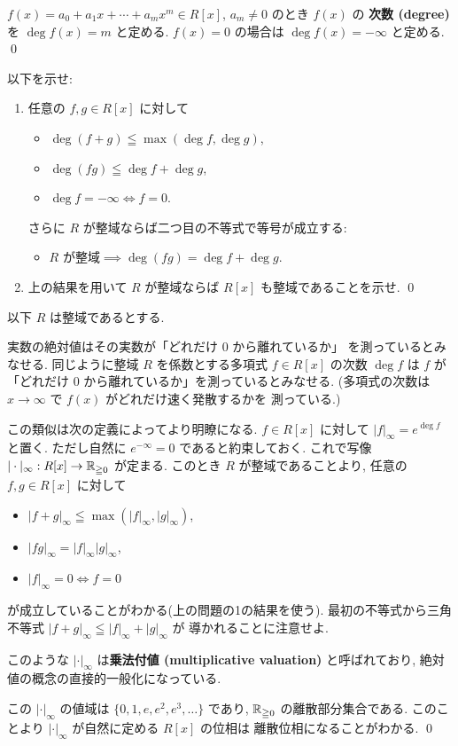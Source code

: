 \documentclass[12pt,twoside]{jarticle}
\begin{document}
\begin{definition}[多項式の次数]
 $f(x)=a_0+a_1x+\cdots+a_mx^m\in R[x]$, $a_m\ne 0$ のとき $f(x)$ の
 {\bf 次数 (degree)} を $\deg f(x)=m$ と定める.
 $f(x)=0$ の場合は $\deg f(x)=-\infty$ と定める.
 \qed
\end{definition}

\begin{question}[整域係数の多項式環も整域1]
 以下を示せ:
 \begin{enumerate}
  \item 任意の $f,g\in R[x]$ に対して
  \begin{itemize}
   \item $\deg(f+g) \leqq \max(\deg f, \deg g)$,
   \item $\deg(fg)  \leqq \deg f + \deg g$,
   \item $\deg f = -\infty \iff f = 0$.
  \end{itemize}
  さらに $R$ が整域ならば二つ目の不等式で等号が成立する:
  \begin{itemize}
   \item $\text{$R$ が整域} \implies \deg(fg)=\deg f+\deg g$.
  \end{itemize}
  \item 上の結果を用いて $R$ が整域ならば $R[x]$ も整域であることを示せ. \qed
 \end{enumerate}
\end{question}

\begin{guide}
 以下 $R$ は整域であるとする.

 実数の絶対値はその実数が「どれだけ $0$ から離れているか」
 を測っているとみなせる.
 同じように整域 $R$ を係数とする多項式 $f\in R[x]$ の次数 $\deg f$ 
 は $f$ が「どれだけ $0$ から離れているか」を測っているとみなせる.
 (多項式の次数は $x\to \infty$ で $f(x)$ がどれだけ速く発散するかを
 測っている.)

 この類似は次の定義によってより明瞭になる.
 $f\in R[x]$ に対して $|f|_\infty=e^{\deg f}$ と置く. 
 ただし自然に $e^{-\infty}=0$ であると約束しておく.
 これで写像 $|\cdot|_\infty:R[x]\to{\mathbb R}_{\geqq0}$ が定まる.
 このとき $R$ が整域であることより, 任意の $f,g\in R[x]$ に対して
 \begin{itemize}
  \item $|f+g|_\infty \leqq \max(|f|_\infty, |g|_\infty)$,
  \item $|fg|_\infty = |f|_\infty |g|_\infty$,
  \item $|f|_\infty=0 \iff f=0$
 \end{itemize}
 が成立していることがわかる(上の問題の1の結果を使う).
 最初の不等式から三角不等式 $|f+g|_\infty\leqq |f|_\infty+|g|_\infty$ が
 導かれることに注意せよ.

 このような $|\cdot|_\infty$ は{\bf 乗法付値 (multiplicative valuation)}
 と呼ばれており, 絶対値の概念の直接的一般化になっている.  

 この $|\cdot|_\infty$ の値域は $\{0,1,e,e^2,e^3,\ldots\}$ であり, %
 ${\mathbb R}_{\geqq0}$ の離散部分集合である.
 このことより $|\cdot|_\infty$ が自然に定める $R[x]$ の位相は
 離散位相になることがわかる.
 \qed
\end{guide}
\end{document}
